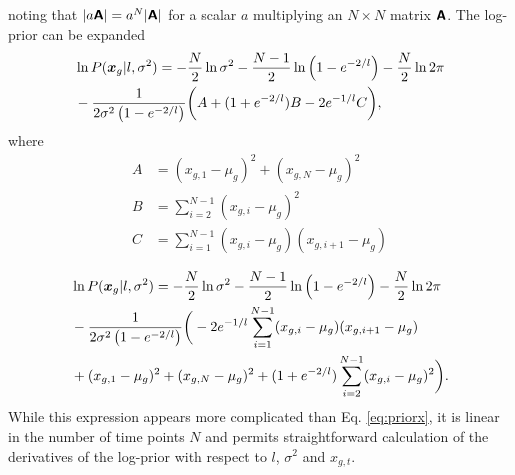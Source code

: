 \documentclass[fleqn,usenatbib]{mnras}
\begin{document}
noting that $|a\textbf{\textsf{A}}|=a^N|\textbf{\textsf{A}}|$ for a scalar $a$ multiplying an $N \times N$ matrix $\textbf{\textsf{A}}$.
The log-prior can be expanded 
\begin{align}
    &\ln{P(\bm{x}_g|l,\sigma^2)}= -\frac{N}{2}\ln{\sigma^2} - \frac{N-1}{2}\ln\left(1-e^{-2/l}\right) -\frac{N}{2}\ln2\pi \nonumber \\ 
    &-\frac{1}{2\sigma^2\left(1-e^{-2/l}\right)}\bigg( A + (1+e^{-2/l})B -2e^{-1/l}C \bigg),
\end{align}
where 
\begin{align}
    A &= (x_{g,1}-\mu_g)^2+ (x_{g,N}-\mu_g)^2 \nonumber \\
    B &= \sum_{i=2}^{N-1}(x_{g,i}-\mu_g)^2 \nonumber \\
    C &= \sum_{i=1}^{N-1}(x_{g,i}-\mu_g)(x_{g,i+1}-\mu_g)
\end{align}

\begin{align}
    &\ln{P(\bm{x}_g|l,\sigma^2)}= -\frac{N}{2}\ln{\sigma^2} - \frac{N-1}{2}\ln\left(1-e^{-2/l}\right) -\frac{N}{2}\ln2\pi \nonumber \\ 
    &-\frac{1}{2\sigma^2\left(1-e^{-2/l}\right)}\bigg( -2e^{-1/l} \sum_{i=1}^{N-1}(x_{g,i}-\mu_g)(x_{g,i+1}-\mu_g)   \nonumber \\
    & +(x_{g,1}-\mu_g)^2+ (x_{g,N}-\mu_g)^2+(1+e^{-2/l})\sum_{i=2}^{N-1}(x_{g,i}-\mu_g)^2   \bigg).
\end{align}
While this expression appears more complicated than Eq. \ref{eq:priorx}, it is linear in the number of time points $N$ and permits straightforward calculation of the derivatives of the log-prior with respect to $l$, $\sigma^2$ and $x_{g,t}$.
\end{document}
